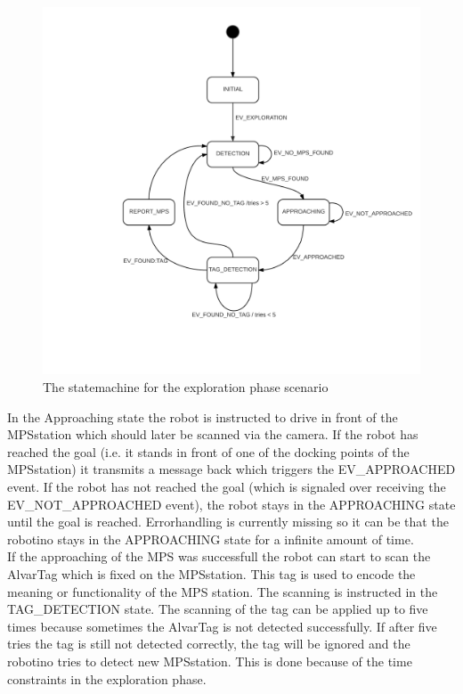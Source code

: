 \begin{figure}
\centering
\includegraphics[scale=0.25]{pic/robotino_state_machine.png}
\caption{The statemachine for the exploration phase scenario}
\label{fig:statemachine}
\end{figure}

\newpage

In the Approaching state the robot is instructed to drive in front of the MPSstation which should later be scanned via the camera. If the robot has reached the goal (i.e. it stands in front of one of the docking points of the MPSstation) it transmits a message back which triggers the EV\_APPROACHED event. If the robot has not reached the goal (which is signaled over receiving the EV\_NOT\_APPROACHED event), the robot stays in the APPROACHING state until the goal is reached. Errorhandling is currently missing so it can be that the robotino stays in the APPROACHING state for a infinite amount of time. \\

If the approaching of the MPS was successfull the robot can start to scan the AlvarTag which is fixed on the MPSstation. This tag is used to encode the meaning or functionality of the MPS station. The scanning is instructed in the TAG\_DETECTION state. The scanning of the tag can be applied up to five times because sometimes the AlvarTag is not detected successfully. If after five tries the tag is still not detected correctly, the tag will be ignored and the robotino tries to detect new MPSstation. This is done because of the time constraints in the exploration phase. \\

